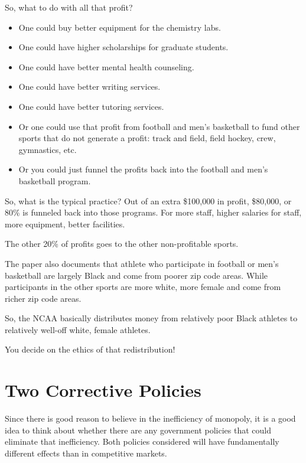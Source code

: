 \documentclass[
]{book}
\providecommand{\tightlist}{%
  \setlength{\itemsep}{0pt}\setlength{\parskip}{0pt}}
\begin{document}
So, what to do with all that profit?

\begin{itemize}
\tightlist
\item
  One could buy better equipment for the chemistry labs.
\item
  One could have higher scholarships for graduate students.
\item
  One could have better mental health counseling.
\item
  One could have better writing services.
\item
  One could have better tutoring services.
\item
  Or one could use that profit from football and men's basketball to fund other sports that do not generate a profit: track and field, field hockey, crew, gymnastics, etc.
\item
  Or you could just funnel the profits back into the football and men's basketball program.
\end{itemize}

So, what is the typical practice? Out of an extra \$100,000 in profit, \$80,000, or 80\% is funneled back into those programs. For more staff, higher salaries for staff, more equipment, better facilities.

The other 20\% of profits goes to the other non-profitable sports.

The paper also documents that athlete who participate in football or men's basketball are largely Black and come from poorer zip code areas. While participants in the other sports are more white, more female and come from richer zip code areas.

So, the NCAA basically distributes money from relatively poor Black athletes to relatively well-off white, female athletes.

You decide on the ethics of that redistribution!

\hypertarget{two-corrective-policies}{%
\section{Two Corrective Policies}\label{two-corrective-policies}}

Since there is good reason to believe in the inefficiency of monopoly, it is a good idea to think about whether there are any government policies that could eliminate that inefficiency. Both policies considered will have fundamentally different effects than in competitive markets.
\end{document}
